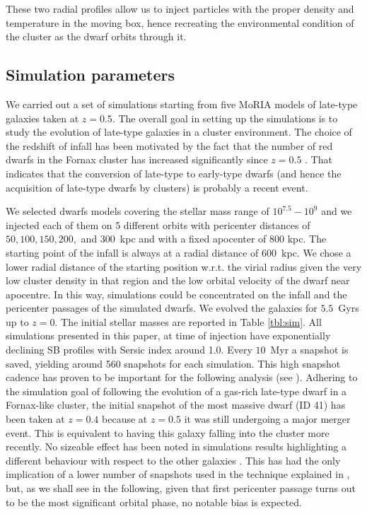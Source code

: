 These two radial profiles allow us to inject particles with the proper density and temperature in the moving box, hence recreating the environmental condition of the cluster as the dwarf orbits through it.

\subsection{Simulation parameters}
We carried out a set of simulations starting from five MoRIA models of late-type galaxies taken at $z = 0.5$.
The overall goal in setting up the simulations is to study the evolution of late-type galaxies in a cluster environment.
The choice of the redshift of infall has been motivated by the fact that the number of red dwarfs in the Fornax cluster has increased significantly since $z = 0.5$ \citep{Stott2007, DeRijcke2010}.
That indicates that the conversion of late-type to early-type dwarfs (and hence the acquisition of late-type dwarfs by clusters) is probably a recent event.

We selected dwarfs models covering the stellar mass range of $10^{7.5}-10^{9}$ and we injected each of them on 5 different orbits with pericenter distances of $50, 100, 150, 200,$ and $300$~kpc and with a fixed apocenter of 800 kpc.
The starting point of the infall is always at a radial distance of 600~kpc.
We chose a lower radial distance of the starting position w.r.t. the virial radius given the very low cluster density in that region and the low orbital velocity of the dwarf near apocentre.
In this way, simulations could be concentrated on the infall and the pericenter passages of the simulated dwarfs.
We evolved the galaxies for $5.5$~Gyrs up to $z=0$.
The initial stellar masses are reported in Table \ref{tbl:sim}.
All simulations presented in this paper, at time of injection have exponentially declining SB profiles with Sersic index around 1.0.
Every $10$~Myr a snapshot is saved, yielding around 560 snapshots for each simulation.
This high snapshot cadence has proven to be important for the following analysis (see ).
Adhering to the simulation goal of following the evolution of a gas-rich late-type dwarf in a Fornax-like cluster, the initial snapshot of the most massive dwarf (ID 41) has been taken at $z=0.4$ because at $z=0.5$ it was still undergoing a major merger event.
This is equivalent to having this galaxy falling into the cluster more recently.
No sizeable effect has been noted in simulations results highlighting a different behaviour with respect to the other galaxies \citep[which underwent their last merger before infalling to the cluster at $z=0.5$, see e.g.][]{Cloet-Osselaer2014}.
This has had the only implication of a lower number of snapshots used in the technique explained in , but, as we shall see in the following, given that first pericenter passage turns out to be the most significant orbital phase, no notable bias is expected.

